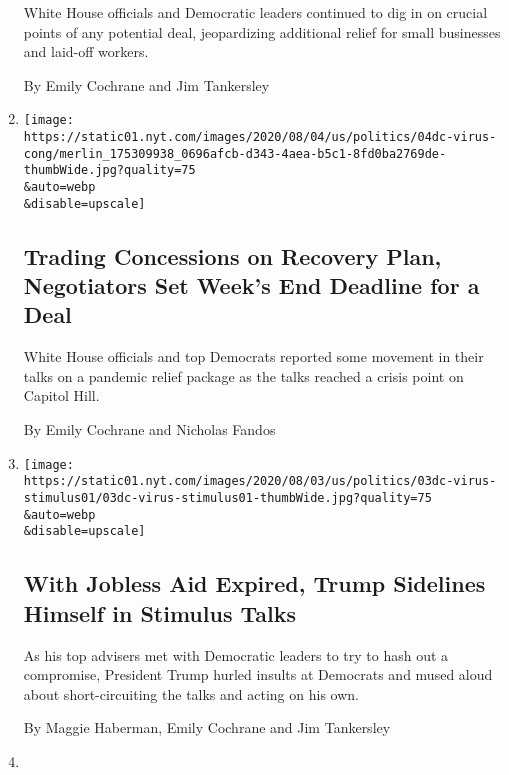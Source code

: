 \begin{enumerate}
  White House officials and Democratic leaders continued to dig in on
  crucial points of any potential deal, jeopardizing additional relief
  for small businesses and laid-off workers.

  By Emily Cochrane and Jim Tankersley
\item
  \href{/2020/08/04/us/politics/coronavirus-recovery-plan-negotiations.html}{}

  \texttt{[image: https://static01.nyt.com/images/2020/08/04/us/politics/04dc-virus-cong/merlin\_175309938\_0696afcb-d343-4aea-b5c1-8fd0ba2769de-thumbWide.jpg?quality=75\\\&auto=webp\\\&disable=upscale]}

  \hypertarget{trading-concessions-on-recovery-plan-negotiators-set-weeks-end-deadline-for-a-deal}{%
  \subsection{Trading Concessions on Recovery Plan, Negotiators Set
  Week's End Deadline for a
  Deal}\label{trading-concessions-on-recovery-plan-negotiators-set-weeks-end-deadline-for-a-deal}}

  White House officials and top Democrats reported some movement in
  their talks on a pandemic relief package as the talks reached a crisis
  point on Capitol Hill.

  By Emily Cochrane and Nicholas Fandos
\item
  \href{/2020/08/03/us/politics/congress-jobless-aid-talks-trump.html}{}

  \texttt{[image: https://static01.nyt.com/images/2020/08/03/us/politics/03dc-virus-stimulus01/03dc-virus-stimulus01-thumbWide.jpg?quality=75\\\&auto=webp\\\&disable=upscale]}

  \hypertarget{with-jobless-aid-expired-trump-sidelines-himself-in-stimulus-talks}{%
  \subsection{With Jobless Aid Expired, Trump Sidelines Himself in
  Stimulus
  Talks}\label{with-jobless-aid-expired-trump-sidelines-himself-in-stimulus-talks}}

  As his top advisers met with Democratic leaders to try to hash out a
  compromise, President Trump hurled insults at Democrats and mused
  aloud about short-circuiting the talks and acting on his own.

  By Maggie Haberman, Emily Cochrane and Jim Tankersley
\item
  \href{/2020/08/02/us/politics/coronavirus-jobless-aid.html}{}


\end{enumerate}
